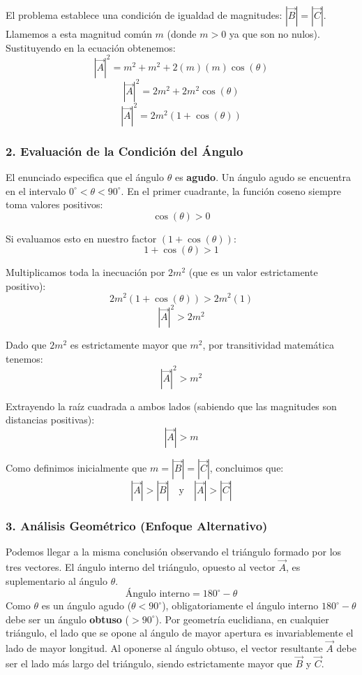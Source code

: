 \documentclass[12pt, a4paper]{article}
\begin{document}
El problema establece una condición de igualdad de magnitudes: $|\vec{B}| = |\vec{C}|$. Llamemos a esta magnitud común $m$ (donde $m > 0$ ya que son no nulos). Sustituyendo en la ecuación obtenemos:
$$|\vec{A}|^2 = m^2 + m^2 + 2(m)(m)\cos(\theta)$$
$$|\vec{A}|^2 = 2m^2 + 2m^2\cos(\theta)$$
$$|\vec{A}|^2 = 2m^2 (1 + \cos(\theta))$$

\subsubsection*{2. Evaluación de la Condición del Ángulo}
El enunciado especifica que el ángulo $\theta$ es \textbf{agudo}. Un ángulo agudo se encuentra en el intervalo $0^\circ < \theta < 90^\circ$. 
En el primer cuadrante, la función coseno siempre toma valores positivos:
$$\cos(\theta) > 0$$

Si evaluamos esto en nuestro factor $(1 + \cos(\theta))$:
$$1 + \cos(\theta) > 1$$

Multiplicamos toda la inecuación por $2m^2$ (que es un valor estrictamente positivo):
$$2m^2 (1 + \cos(\theta)) > 2m^2 (1)$$
$$|\vec{A}|^2 > 2m^2$$

Dado que $2m^2$ es estrictamente mayor que $m^2$, por transitividad matemática tenemos:
$$|\vec{A}|^2 > m^2$$

Extrayendo la raíz cuadrada a ambos lados (sabiendo que las magnitudes son distancias positivas):
$$|\vec{A}| > m$$

Como definimos inicialmente que $m = |\vec{B}| = |\vec{C}|$, concluimos que:
$$|\vec{A}| > |\vec{B}| \quad \text{y} \quad |\vec{A}| > |\vec{C}|$$

\subsubsection*{3. Análisis Geométrico (Enfoque Alternativo)}
Podemos llegar a la misma conclusión observando el triángulo formado por los tres vectores. El ángulo interno del triángulo, opuesto al vector $\vec{A}$, es suplementario al ángulo $\theta$.
$$\text{Ángulo interno} = 180^\circ - \theta$$
Como $\theta$ es un ángulo agudo ($\theta < 90^\circ$), obligatoriamente el ángulo interno $180^\circ - \theta$ debe ser un ángulo \textbf{obtuso} ($> 90^\circ$). 
Por geometría euclidiana, en cualquier triángulo, el lado que se opone al ángulo de mayor apertura es invariablemente el lado de mayor longitud. Al oponerse al ángulo obtuso, el vector resultante $\vec{A}$ debe ser el lado más largo del triángulo, siendo estrictamente mayor que $\vec{B}$ y $\vec{C}$.
\end{document}
